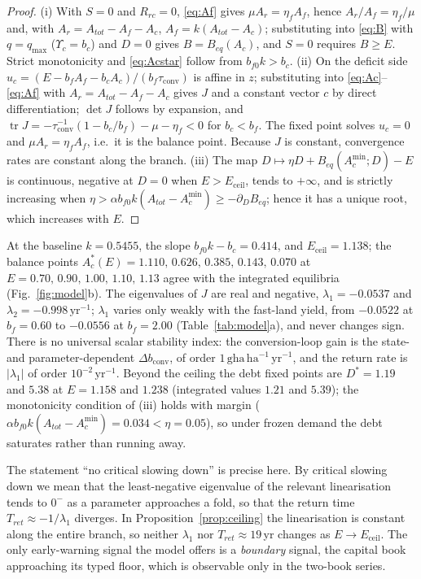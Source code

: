 \documentclass[preprint,12pt,authoryear]{elsarticle}
\newcommand{\dconv}{\Delta b_{\mathrm{conv}}}
\newcommand{\Ups}{\Upsilon_c}
\newcommand{\Eceil}{E_{\mathrm{ceil}}}
\newcommand{\Acmin}{A_c^{\min}}
\newcommand{\tconv}{\tau_{\mathrm{conv}}}
\begin{document}
\begin{proof}
(i) With $S=0$ and $R_{rc}=0$, \eqref{eq:Af} gives $\mu A_r=\eta_fA_f$, hence $A_r/A_f=\eta_f/\mu$ and, with $A_r=A_{tot}-A_f-A_c$, $A_f=k(A_{tot}-A_c)$; substituting into \eqref{eq:B} with $q=q_{\max}$ ($\Ups=b_c$) and $D=0$ gives $B=B_{eq}(A_c)$, and $S=0$ requires $B\ge E$. Strict monotonicity and \eqref{eq:Acstar} follow from $b_{f0}k>b_c$. (ii) On the deficit side $u_c=(E-b_fA_f-b_cA_c)/(b_f\tconv)$ is affine in $z$; substituting into \eqref{eq:Ac}--\eqref{eq:Af} with $A_r=A_{tot}-A_f-A_c$ gives $J$ and a constant vector $c$ by direct differentiation; $\det J$ follows by expansion, and $\operatorname{tr}J=-\tconv^{-1}(1-b_c/b_f)-\mu-\eta_f<0$ for $b_c<b_f$. The fixed point solves $u_c=0$ and $\mu A_r=\eta_fA_f$, i.e.\ it is the balance point. Because $J$ is constant, convergence rates are constant along the branch. (iii) The map $D\mapsto\eta D+B_{eq}(\Acmin;D)-E$ is continuous, negative at $D=0$ when $E>\Eceil$, tends to $+\infty$, and is strictly increasing when $\eta>\alpha b_{f0}k(A_{tot}-\Acmin)\ge-\partial_DB_{eq}$; hence it has a unique root, which increases with $E$.
\end{proof}

At the baseline $k=0.5455$, the slope $b_{f0}k-b_c=0.414$, and $\Eceil=1.138$; the balance points $A_c^*(E)=1.110,\,0.626,\,0.385,\,0.143,\,0.070$ at $E=0.70,\,0.90,\,1.00,\,1.10,\,1.13$ agree with the integrated equilibria (Fig.~\ref{fig:model}b). The eigenvalues of $J$ are real and negative, $\lambda_1=-0.0537$ and $\lambda_2=-0.998\,\mathrm{yr}^{-1}$; $\lambda_1$ varies only weakly with the fast-land yield, from $-0.0522$ at $b_f=0.60$ to $-0.0556$ at $b_f=2.00$ (Table~\ref{tab:model}a), and never changes sign. There is no universal scalar stability index: the conversion-loop gain is the state- and parameter-dependent $\dconv$, of order $1\,\mathrm{gha\,ha^{-1}\,yr^{-1}}$, and the return rate is $|\lambda_1|$ of order $10^{-2}\,\mathrm{yr}^{-1}$. Beyond the ceiling the debt fixed points are $D^*=1.19$ and $5.38$ at $E=1.158$ and $1.238$ (integrated values $1.21$ and $5.39$); the monotonicity condition of (iii) holds with margin ($\alpha b_{f0}k(A_{tot}-\Acmin)=0.034<\eta=0.05$), so under frozen demand the debt saturates rather than running away.

The statement ``no critical slowing down'' is precise here. By critical slowing down we mean that the least-negative eigenvalue of the relevant linearisation tends to $0^-$ as a parameter approaches a fold, so that the return time $T_{ret}\approx-1/\lambda_1$ diverges. In Proposition~\ref{prop:ceiling} the linearisation is constant along the entire branch, so neither $\lambda_1$ nor $T_{ret}\approx19$\,yr changes as $E\to\Eceil$. The only early-warning signal the model offers is a \emph{boundary} signal, the capital book approaching its typed floor, which is observable only in the two-book series.
\end{document}
